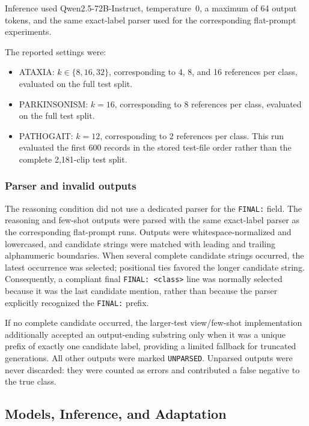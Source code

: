 Inference used Qwen2.5-72B-Instruct, temperature~0, a maximum of
64 output tokens, and the same exact-label parser used for the corresponding
flat-prompt experiments.

The reported settings were:
\begin{itemize}
    \item ATAXIA: $k\in\{8,16,32\}$, corresponding to
    4, 8, and 16 references per class, evaluated on the full test
    split.
    \item PARKINSONISM: $k=16$, corresponding to 8 references per
    class, evaluated on the full test split.
    \item PATHOGAIT: $k=12$, corresponding to 2 references per class.
    This run evaluated the first 600 records in the stored test-file
    order rather than the complete 2,181-clip test split.
\end{itemize}

\subsubsection{Parser and invalid outputs}

The reasoning condition did not use a dedicated parser for the
\texttt{FINAL:} field. The reasoning and few-shot outputs were parsed
with the same exact-label parser as the corresponding flat-prompt
runs. Outputs were whitespace-normalized and lowercased, and candidate
strings were matched with leading and trailing alphanumeric
boundaries. When several complete candidate strings occurred, the
latest occurrence was selected; positional ties favored the longer
candidate string. Consequently, a compliant final
\texttt{FINAL: <class>} line was normally selected because it was the
last candidate mention, rather than because the parser explicitly
recognized the \texttt{FINAL:} prefix.

If no complete candidate occurred, the larger-test view/few-shot implementation additionally
accepted an output-ending substring only when it was a unique prefix
of exactly one candidate label, providing a limited fallback for
truncated generations. All other outputs were marked
\texttt{UNPARSED}. Unparsed outputs were never discarded: they were
counted as errors and contributed a false negative to the true class.

\subsection{Models, Inference, and Adaptation}
\label{sec:supp_models}

